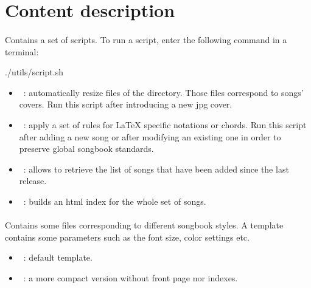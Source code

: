 \section{Content description}
\label{sec:contents}

\paragraph{}
\label{sec:utils}
Contains a set of scripts. To run a script, enter the following command in a terminal:

\begin{unix}
  ./utils/script.sh
\end{unix}

\begin{itemize}
\item {}~: automatically resize  files of
  the  directory. Those files correspond to
  songs' covers. Run this script after introducing a new jpg cover.

\item {}~: apply a set of rules for \LaTeX{} specific
  notations or chords. Run this script after adding a new song or
  after modifying an existing one in order to preserve global songbook
  standards.

\item {}~: allows to retrieve the list of songs
  that have been added since the last release.

\item {}~: builds an html index for the whole set of
  songs.
\end{itemize}

\paragraph{}
Contains some files corresponding to different songbook styles. A
template contains some parameters such as the font size, color
settings etc.

\begin{itemize}
\item {}~: default template.
\item {}~: a more compact version without front page
  nor indexes.
\end{itemize}

